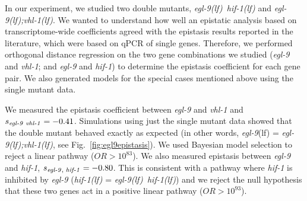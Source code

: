\documentclass[9pt,twocolumn,twoside,lineno]{pnas-new}
\newcommand{\gene}[1]{\mbox{\emph{#1}}}
\newcommand{\egl}{\gene{egl-9}(lf)}
\newcommand{\eglvhl}{\gene{egl-9(lf);vhl-1(lf)}}
\newcommand{\eglhif}{\gene{egl-9(lf) hif-1(lf)}}
\newcommand{\hif}{\gene{hif-1(lf)}}
\begin{document}
In our experiment, we studied two double mutants, \eglhif{} and \eglvhl{}. We
wanted to understand how well an epistatic analysis based on transcriptome-wide
coefficients agreed with the epistasis results reported in the literature, which
were based on qPCR of single genes. Therefore, we performed orthogonal distance
regression on the two gene combinations we studied (\gene{egl-9} and
\gene{vhl-1}; and \gene{egl-9} and \gene{hif-1}) to determine the epistasis
coefficient for each gene pair. We also generated models for the special cases
mentioned above using the single mutant data.


We measured the epistasis coefficient between \gene{egl-9} and \gene{vhl-1} and
$s_{\text{\gene{egl-9} \gene{vhl-1}}} = -0.41$. Simulations using just the
single mutant data showed that the double mutant behaved exactly as expected (in
other words, \egl{} = \eglvhl{}, see Fig.~\ref{fig:egl9epistasis}). We used
Bayesian model selection to reject a linear pathway ($OR>10^{83}$). We also
measured epistasis between \gene{egl-9} and \gene{hif-1},
$s_{\text{\gene{egl-9}, \gene{hif-1}}} = -0.80$. This is consistent with a
pathway where \gene{hif-1} is inhibited by \gene{egl-9} (\hif{} =
\eglhif{}) and we reject the null hypothesis that these two genes act in a
positive linear pathway ($OR > 10^{93}$).
\end{document}
